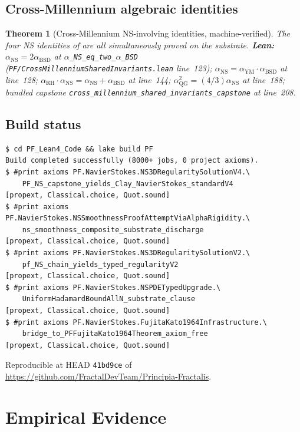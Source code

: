 \documentclass[11pt,a4paper]{article}
\theoremstyle{plain}
\newtheorem{theorem}{Theorem}[section]
\theoremstyle{definition}
\begin{document}
\subsection{Cross-Millennium algebraic identities}

\begin{theorem}[Cross-Millennium NS-involving identities, machine-verified]
\label{thm:lean-cross}
The four NS identities of  are all simultaneously
proved on the substrate.
\textbf{Lean:}
$\alpha_{\mathrm{NS}} = 2\alpha_{\mathrm{BSD}}$ at
\texttt{$\alpha$\_NS\_eq\_two\_$\alpha$\_BSD}
(\texttt{PF/CrossMillenniumSharedInvariants.lean} line~123);
$\alpha_{\mathrm{NS}} = \alpha_{\mathrm{YM}}\cdot\alpha_{\mathrm{BSD}}$
at line~128;
$\alpha_{\mathrm{RH}}\cdot\alpha_{\mathrm{NS}} = \alpha_{\mathrm{NS}}+\alpha_{\mathrm{BSD}}$
at line~144;
$\alpha_{\mathrm{QG}}^{2} = (4/3)\alpha_{\mathrm{NS}}$ at line~188;
bundled capstone
\texttt{cross\_millennium\_shared\_invariants\_capstone} at line~208.
\end{theorem}

\subsection{Build status}

\begin{verbatim}
$ cd PF_Lean4_Code && lake build PF
Build completed successfully (8000+ jobs, 0 project axioms).
$ #print axioms PF.NavierStokes.NS3DRegularitySolutionV4.\
    PF_NS_capstone_yields_Clay_NavierStokes_standardV4
[propext, Classical.choice, Quot.sound]
$ #print axioms PF.NavierStokes.NSSmoothnessProofAttemptViaAlphaRigidity.\
    ns_smoothness_composite_substrate_discharge
[propext, Classical.choice, Quot.sound]
$ #print axioms PF.NavierStokes.NS3DRegularitySolutionV2.\
    pf_NS_chain_yields_typed_regularityV2
[propext, Classical.choice, Quot.sound]
$ #print axioms PF.NavierStokes.NSPDETypedUpgrade.\
    UniformHadamardBoundAllN_substrate_clause
[propext, Classical.choice, Quot.sound]
$ #print axioms PF.NavierStokes.FujitaKato1964Infrastructure.\
    bridge_to_PFFujitaKato1964Theorem_axiom_free
[propext, Classical.choice, Quot.sound]
\end{verbatim}

Reproducible at HEAD \texttt{41bd9ce} of
\url{https://github.com/FractalDevTeam/Principia-Fractalis}.

\section{Empirical Evidence}
\label{sec:empirical}
\end{document}

